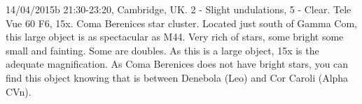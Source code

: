 \item 14/04/2015b 21:30-23:20, Cambridge, UK. 2 - Slight undulations, 5 - Clear. Tele Vue 60 F6, 15x. Coma Berenices star cluster. Located just south of Gamma Com, this large object is as spectacular as M44. Very rich of stars, some bright some small and fainting. Some are doubles. As this is a large object, 15x is the adequate magnification. As Coma Berenices does not have bright stars, you can find this object knowing that is between Denebola (Leo) and Cor Caroli (Alpha CVn).
